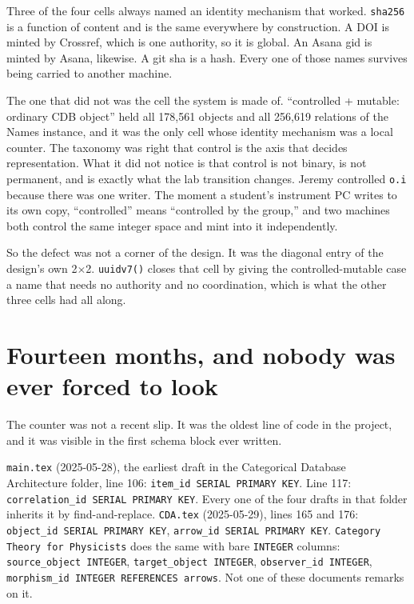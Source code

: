 Three of the four cells always named an identity mechanism that worked. \texttt{sha256} is a function of content and is the same everywhere by construction. A DOI is minted by Crossref, which is one authority, so it is global. An Asana gid is minted by Asana, likewise. A git sha is a hash. Every one of those names survives being carried to another machine.

The one that did not was the cell the system is made of. ``controlled + mutable: ordinary CDB object'' held all 178{,}561 objects and all 256{,}619 relations of the Names instance, and it was the only cell whose identity mechanism was a local counter. The taxonomy was right that control is the axis that decides representation. What it did not notice is that control is not binary, is not permanent, and is exactly what the lab transition changes. Jeremy controlled \texttt{o.i} because there was one writer. The moment a student's instrument PC writes to its own copy, ``controlled'' means ``controlled by the group,'' and two machines both control the same integer space and mint into it independently.

So the defect was not a corner of the design. It was the diagonal entry of the design's own 2$\times$2. \texttt{uuidv7()} closes that cell by giving the controlled-mutable case a name that needs no authority and no coordination, which is what the other three cells had all along.

\section{Fourteen months, and nobody was ever forced to look}

The counter was not a recent slip. It was the oldest line of code in the project, and it was visible in the first schema block ever written.

\texttt{main.tex} (2025-05-28), the earliest draft in the Categorical Database Architecture folder, line 106: \texttt{item\_id SERIAL PRIMARY KEY}. Line 117: \texttt{correlation\_id SERIAL PRIMARY KEY}. Every one of the four drafts in that folder inherits it by find-and-replace. \texttt{CDA.tex} (2025-05-29), lines 165 and 176: \texttt{object\_id SERIAL PRIMARY KEY}, \texttt{arrow\_id SERIAL PRIMARY KEY}. \texttt{Category Theory for Physicists} does the same with bare \texttt{INTEGER} columns: \texttt{source\_object INTEGER}, \texttt{target\_object INTEGER}, \texttt{observer\_id INTEGER}, \texttt{morphism\_id INTEGER REFERENCES arrows}. Not one of these documents remarks on it.

